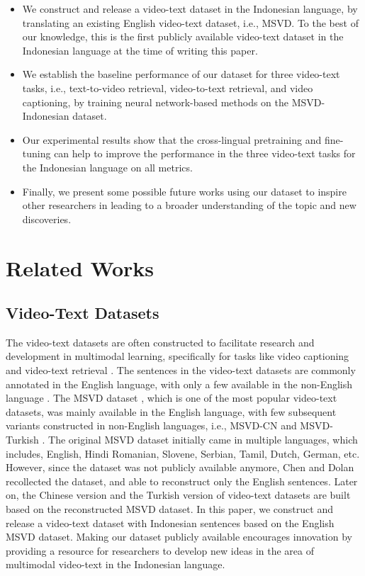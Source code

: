 \documentclass{article}
\begin{document}
\begin{itemize}
\item We construct and release a video-text dataset in the Indonesian language, by translating an existing English video-text dataset, i.e., MSVD. To the best of our knowledge, this is the first publicly available video-text dataset in the Indonesian language at the time of writing this paper.
\item We establish the baseline performance of our dataset for three video-text tasks, i.e., text-to-video retrieval, video-to-text retrieval, and video captioning, by training neural network-based methods on the MSVD-Indonesian dataset.
\item Our experimental results show that the cross-lingual pretraining and fine-tuning can help to improve the performance in the three video-text tasks for the Indonesian language on all metrics.
\item Finally, we present some possible future works using our dataset to inspire other researchers in leading to a broader understanding of the topic and new discoveries.

\end{itemize}


\section{Related Works}
\label{sec:headings}

\subsection{Video-Text Datasets}
The video-text datasets are often constructed to facilitate research and development in multimodal learning, specifically for tasks like video captioning \cite{venugopalan15iccv} and video-text retrieval \cite{10.1145/3503161.3547910}. The sentences in the video-text datasets are commonly annotated in the English language, with only a few available in the non-English language \cite{Wang_2019_ICCV, 8806555, IJCOL:scaiella_et_al:2019, 10.1007/s00530-021-00816-3}. The MSVD dataset \cite{chen:acl11}, which is one of the most popular video-text datasets, was mainly available in the English language, with few subsequent variants constructed in non-English languages, i.e., MSVD-CN \cite{msvdcn} and MSVD-Turkish \cite{8806555}. The original MSVD dataset initially came in multiple languages, which includes, English, Hindi Romanian, Slovene, Serbian, Tamil, Dutch, German, etc. However, since the dataset was not publicly available anymore, Chen and Dolan \cite{chen:acl11} recollected the dataset, and able to reconstruct only the English sentences. Later on, the Chinese version \cite{msvdcn} and the Turkish version \cite{8806555} of video-text datasets are built based on the reconstructed MSVD dataset. In this paper, we construct and release a video-text dataset with Indonesian sentences based on the English MSVD dataset. Making our dataset publicly available encourages innovation by providing a resource for researchers to develop new ideas in the area of multimodal video-text in the Indonesian language.         
\end{document}
